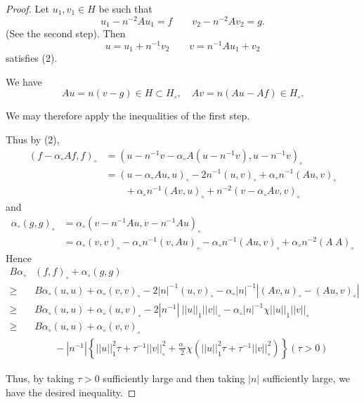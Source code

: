 \begin{proof}
 Let $u_1, v_1 \in H$ be such that
 $$
 u_1 - n^{-2} A u_1 = f \qquad v_2 - n^{-2} A v_2 = g.
 $$
 (See the second step). Then
 $$
 u = u_1 + n^{-1}v_2 \qquad v=n^{-1} A u_1 + v_2
 $$
 satisfies (2).
 
 We have
 $$
 A u = n(v-g) \in H \subset H_\circ, \quad A v = n(Au - Af) \in H_\circ.
 $$
 
 We may therefore apply the inequalities of the first step.
 
 Thus by (2),
 \begin{align*}
  (f -\alpha_\circ Af, f)_\circ & = (u - n^{-1} v - \alpha_\circ A(u -n^{-1}
  v), u -n^{-1}v)_\circ \\ 
  & = (u - \alpha_\circ Au, u)_\circ -2n^{-1} (u, v)_\circ +
  \alpha_\circ n^{-1} (Au, v)_\circ \\ 
  & \qquad + \alpha_\circ n^{-1} (Av, u)_\circ + n^{-2} (v - \alpha_\circ A
  v, v)_\circ 
 \end{align*}
 and
 \begin{align*}
  \alpha_\circ (g, g)_\circ & = \alpha_\circ (v -n^{-1} A u, v -
  n^{-1} A u)_\circ \\ 
  & = \alpha_\circ (v,v)_\circ - \alpha_\circ n^{-1} (v, A u)_\circ -
 \alpha_\circ n^{-1} (Au, v)_\circ + \alpha_\circ n^{-2}(A~A)_\circ 
\end{align*}
Hence\pageoriginale 
 \begin{align*}
  B \alpha_\circ & (f, f)_\circ + \alpha_\circ (g, g)\\
  \geq & B \alpha_\circ (u,u)+ \alpha_\circ (v, v)_\circ -2|n|^{-1}
  (u,v)_\circ - \alpha_\circ |n|^{-1} | (Av, u)_\circ - (Au, v)_\circ
  |\\ 
  \geq & B \alpha_\circ (u,u)+ \alpha_\circ (u, v)_\circ -2|n^{-1} |
  ~|| u ||_1 || v ||_\circ - \alpha_\circ |n|^{-1} \chi || u ||_1 || v
  ||_\circ \\ 
  \geq & B \alpha_\circ (u,u)+ \alpha_\circ (v,v)_\circ\\ 
  & \qquad -|n^{-1}|
  \left\{ || u ||^2_1 \tau + \tau^{-1} || v ||^2_\circ 
  + \frac{\alpha_\circ}{2} \chi ( || u ||^2_1 \tau + \tau^{-1} || v
  ||^2_\circ )\right \} ( \tau > 0) 
 \end{align*}
 
 Thus, by taking $\tau > 0$ sufficiently large and then taking $| n |$
 sufficiently large, we have the desired inequality. 
\end{proof}

